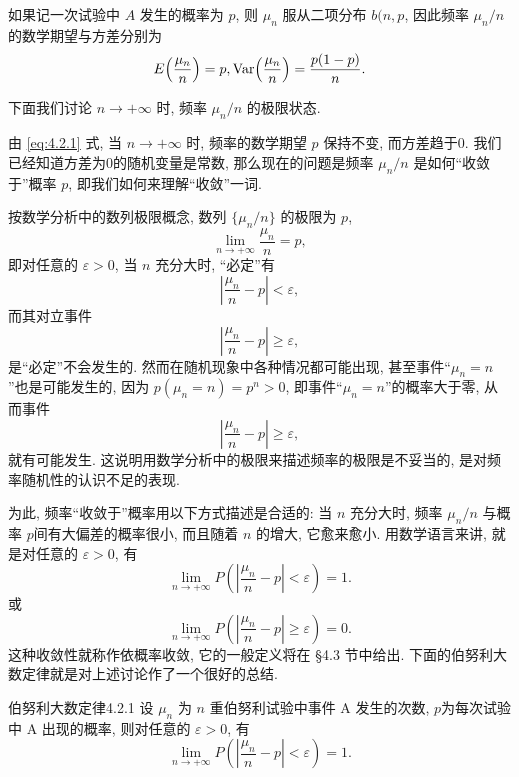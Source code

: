 如果记一次试验中 $ A $ 发生的概率为 $ p $, 则 $ \mu_n $ 服从二项分布 $ b (n, p $, 因此频率 $ \mu_n / n $ 的数学期望与方差分别为
\begin{equation}\label{eq:4.2.1}
    E \left( \frac{\mu_n}{n} \right) = p, \Var  \left( \frac{\mu_n}{n} \right) = \frac{p ( 1 - p )}{n}.
\end{equation}

下面我们讨论 $ n \to +\infty $ 时, 频率 $ \mu_n / n $ 的极限状态.

由 \eqref{eq:4.2.1} 式, 当 $ n \to +\infty $  时, 频率的数学期望 $ p $ 保持不变, 而方差趋于0.
我们已经知道方差为0的随机变量是常数, 那么现在的问题是频率 $ \mu_n / n $ 是如何``收敛于''概率 $ p $, 即我们如何来理解``收敛''一词.

按数学分析中的数列极限概念, 数列 $ \{ \mu_n / n \} $ 的极限为 $ p $,
\begin{equation*}
    \lim_{n \to +\infty} \frac{\mu_n}{n} = p,
\end{equation*}
即对任意的 $ \varepsilon > 0 $, 当 $ n $ 充分大时, ``必定''有
\begin{equation*}
    \left\lvert \frac{\mu_n}{n} - p \right\rvert < \varepsilon,
\end{equation*}
而其对立事件
\begin{equation*}
    \left\lvert \frac{\mu_n}{n} - p \right\rvert \geq \varepsilon,
\end{equation*}
是``必定''不会发生的.
然而在随机现象中各种情况都可能出现, 甚至事件``$ \mu_n = n $''也是可能发生的, 因为 $ p ( \mu_n = n )=p^n > 0 $, 即事件``$ \mu_n = n $''的概率大于零, 从而事件
\begin{equation*}
    \left\lvert \frac{\mu_n}{n} - p \right\rvert \geq \varepsilon,
\end{equation*}
就有可能发生.
这说明用数学分析中的极限来描述频率的极限是不妥当的, 是对频率随机性的认识不足的表现.

为此, 频率``收敛于''概率用以下方式描述是合适的: 当 $ n $ 充分大时, 频率 $ \mu_n / n $ 与概率 $ p $间有大偏差的概率很小, 而且随着 $ n $ 的增大, 它愈来愈小.
用数学语言来讲, 就是对任意的 $ \varepsilon > 0 $, 有
\begin{equation}\label{eq:4.2.2}
    \lim_{n \to +\infty} P \left( \left\lvert \frac{\mu_n}{n} - p \right\rvert < \varepsilon \right) = 1.
\end{equation}
或
\begin{equation}\label{eq:4.2.3}
    \lim_{n \to +\infty} P \left( \left\lvert \frac{\mu_n}{n} - p \right\rvert \geq \varepsilon \right) = 0.
\end{equation}
这种收敛性就称作{\heiti 依概率收敛}, 它的一般定义将在 \S 4.3 节中给出.
下面的伯努利大数定律就是对上述讨论作了一个很好的总结.
\begin{theorem}{伯努利大数定律}{4.2.1}
    设 $ \mu_n $ 为 $ n $ 重伯努利试验中事件 A 发生的次数, $ p $为每次试验中 A 出现的概率, 则对任意的 $ \varepsilon > 0 $, 有
    \begin{equation*}
        \lim_{n \to +\infty} P \left( \left\lvert \frac{\mu_n}{n} - p \right\rvert < \varepsilon \right) = 1.
    \end{equation*}
\end{theorem}

